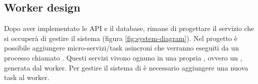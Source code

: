 \documentclass[main.tex]{subfiles}
\begin{document}
\subsection{Worker design}\label{sec:workerfdesign}
Dopo aver implementato le API e il database, rimane di progettare il servizio che si occuperà di gestire il sistema (figura \ref{fig:system-diagram}). \newline
Nel progetto  è possibile aggiungere micro-servizi/task asincroni che verranno eseguiti da un processo chiamato . Questi servizi vivono ognuno in una propria , ovvero un \cite{Goroutine}, generata dal worker.\newline
Per gestire il sistema di  è necessario aggiungere una nuova task al worker.\newline
\end{document}
